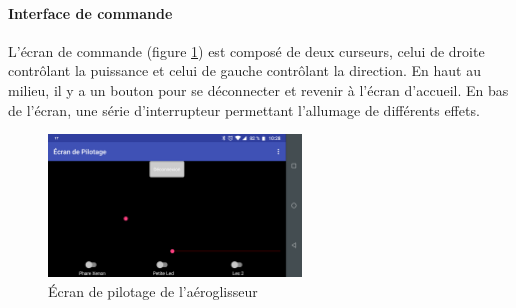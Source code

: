 			\paragraph{Interface de commande} L'écran de commande (figure \ref{Pilo}) est composé de deux curseurs, celui de droite contrôlant la puissance et celui de gauche contrôlant la direction. En haut au milieu, il y a un bouton pour se déconnecter et revenir à l'écran d'accueil. En bas de l'écran, une série d'interrupteur permettant l'allumage de différents effets.
			\begin{figure}
		\begin{center}
			\includegraphics[width=0.6\textwidth]{../Illus/AppPilotage.png}
		\end{center}
			\caption{Écran de pilotage de l'aéroglisseur}
			\label{Pilo}
		\end{figure}
